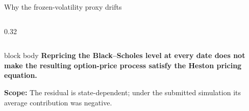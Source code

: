 \begin{frame}[t]{Why the frozen-volatility proxy drifts}
\begin{columns}[T,onlytextwidth]
\begin{column}{0.32\textwidth}
      \centering{}
    \end{column}
  \end{columns}
  \vspace{0.14cm}
  \begin{beamercolorbox}[rounded=true,sep=0.12cm]{block body}
    {\fontsize{7.4}{8.7}\selectfont\bfseries Repricing the Black--Scholes level at every date does not make the resulting option-price process satisfy the Heston pricing equation.}
  \end{beamercolorbox}
  \vspace{0.05cm}
  {\scriptsize\textbf{Scope:} The residual is state-dependent; under the submitted simulation its average contribution was negative.\par}
\end{frame}

